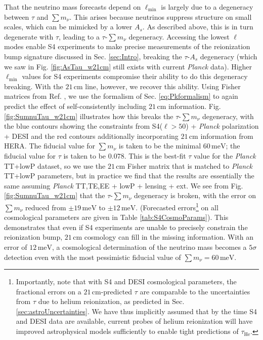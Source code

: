 \documentclass[twocolumn,aps,prd,nofootinbib,showpacs,superscriptaddress]{revtex4-1}
\begin{document}
That the neutrino mass forecasts depend on $\ell_\textrm{min}$ is largely due to a degeneracy between $\tau$ and $\sum m_\nu$. This arises because neutrinos suppress structure on small scales, which can be mimicked by a lower $A_s$. As described above, this is in turn degenerate with $\tau$, leading to a $\tau$-$\sum m_\nu$ degeneracy. Accessing the lowest $\ell$ modes enable S4 experiments to make precise measurements of the reionization bump signature discussed in Sec. \ref{sec:Intro}, breaking the $\tau$-$A_s$ degeneracy (which we saw in Fig. \ref{fig:AsTau_w21cm} still exists with current \emph{Planck} data). Higher $\ell_\textrm{min}$ values for S4 experiments compromise their ability to do this degeneracy breaking. With the $21\,\textrm{cm}$ line, however, we recover this ability. Using Fisher matrices from Ref. \cite{allison_et_al2015}, we use the formalism of Sec. \ref{eq:Pkformalism} to again predict the effect of self-consistently including $21\,\textrm{cm}$ information. Fig. \ref{fig:SumnuTau_w21cm} illustrates how this breaks the $\tau$-$\sum m_\nu$ degeneracy, with the blue contours showing the constraints from S4($\ell > 50$) + \emph{Planck} polarization + DESI and the red contours additionally incorporating $21\,\textrm{cm}$ information from HERA. The fiducial value for $\sum m_\nu$ is taken to be the minimal $60\,\textrm{meV}$; the fiducial value for $\tau$ is taken to be $0.078$. This is the best-fit $\tau$ value for the \emph{Planck} TT+lowP dataset, so we use the $21\,\textrm{cm}$ Fisher matrix that is matched to \emph{Planck} TT+lowP parameters, but in practice we find that the results are essentially the same assuming \emph{Planck} TT,TE,EE + lowP + lensing + ext. We see from Fig. \ref{fig:SumnuTau_w21cm} that the $\tau$-$\sum m_\nu$ degeneracy is broken, with the error on 
$\sum m_\nu$ reduced from $\pm 19 \,\textrm{meV}$ to $\pm 12 \,\textrm{meV}$. (Forecasted errors\footnote{Importantly, note that with S4 and DESI cosmological parameters, the fractional errors on a $21\,\textrm{cm}$-predicted $\tau$ are comparable to the uncertainties from $\tau$ due to helium reionization, as predicted in Sec. \ref{sec:astroUncertainties}. We have thus implicitly assumed that by the time S4 and DESI data are available, current probes of helium reionization will have improved astrophysical models sufficiently to enable tight predictions of $\tau_\textrm{He}$.} on all cosmological parameters are given in Table \ref{tab:S4CosmoParams}). This demonstrates that even if S4 experiments are unable to precisely constrain the reionization bump, $21\,\textrm{cm}$ cosmology can fill in the missing information. With an error of $12 \,\textrm{meV}$, a cosmological determination of the neutrino mass becomes a $5\sigma$ detection even with the most pessimistic fiducial value of $\sum m_\nu = 60\,\textrm{meV}$.
\end{document}
